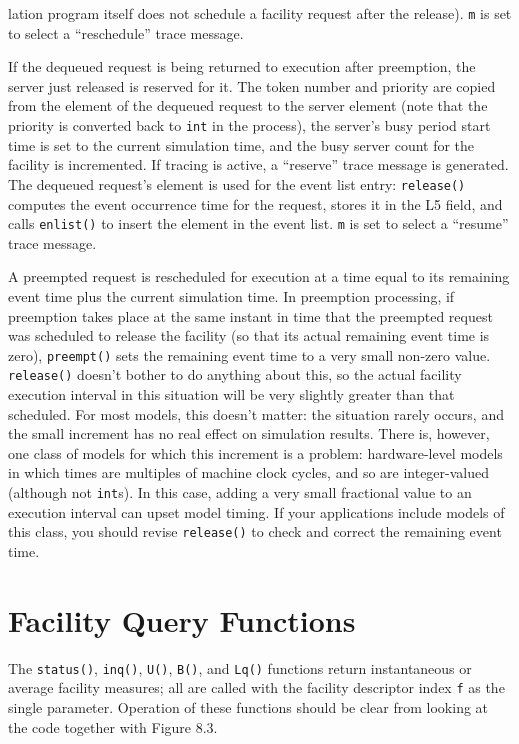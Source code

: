 \noindent lation program itself does not schedule a facility request after the release).
\texttt{m} is set to select a ``reschedule'' trace message.

If the dequeued request is being returned to execution after preemption,
the server just released is reserved for it. The token number and priority are
copied from the element of the dequeued request to the server element (note
that the priority is converted back to \texttt{int} in the process), the server's busy
period start time is set to the current simulation time, and the busy server
count for the facility is incremented. If tracing is active, a ``reserve'' trace
message is generated. The dequeued request's element is used for the event
list entry: \texttt{release()} computes the event occurrence time for the request,
stores it in the L5 field, and calls \texttt{enlist()} to insert the element in the
event list. \texttt{m} is set to select a ``resume'' trace message.

A preempted request is rescheduled for execution at a time equal to its
remaining event time plus the current simulation time. In preemption
processing, if preemption takes place at the same instant in time that the
preempted request was scheduled to release the facility (so that its actual
remaining event time is zero), \texttt{preempt()} sets the remaining event time to a
very small non-zero value. \texttt{release()} doesn't bother to do anything about
this, so the actual facility execution interval in this situation will be very
slightly greater than that scheduled. For most models, this doesn't matter:
the situation rarely occurs, and the small increment has no real effect on
simulation results. There is, however, one class of models for which this
increment is a problem: hardware-level models in which times are
multiples of machine clock cycles, and so are integer-valued (although not
\texttt{int}s). In this case, adding a very small fractional value to an execution
interval can upset model timing. If your applications include models of this
class, you should revise \texttt{release()} to check and correct the remaining event
time.

\section{Facility Query Functions}

The \texttt{status()}, \texttt{inq()}, \texttt{U()}, \texttt{B()}, and \texttt{Lq()} functions return instantaneous
or average facility measures; all are called with the facility
descriptor index \texttt{f} as the single parameter. Operation of these functions
should be clear from looking at the code together with Figure 8.3.

